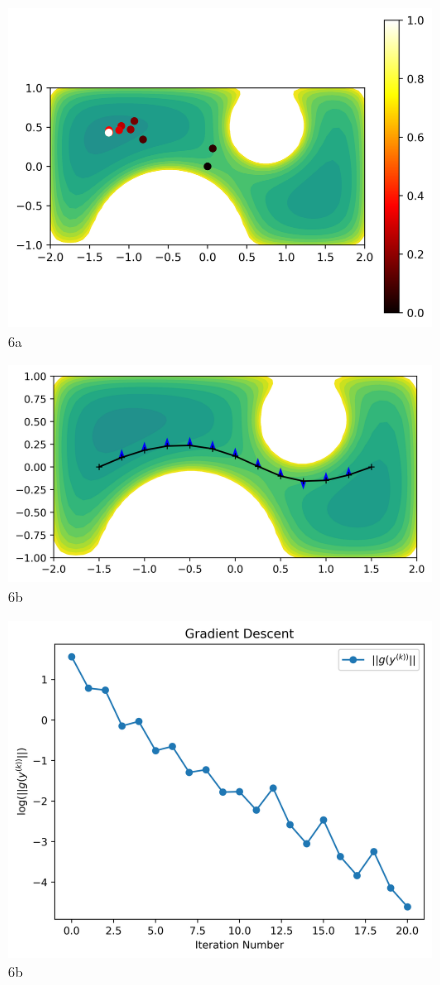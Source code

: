 \documentclass{article}
\begin{document}
\begin{figure}[!ht]
    \centering
    \includegraphics[scale=1]{fig1.png}
    \caption{6a}
\end{figure}

\clearpage

\begin{figure}[!ht]
    \centering
    \includegraphics[scale=0.8]{fig2.png}
    \caption{6b}
\end{figure}

\begin{figure}[!ht]
    \centering
    \includegraphics[scale=0.8]{fig3.png}
    \caption{6b}
\end{figure}
\end{document}
